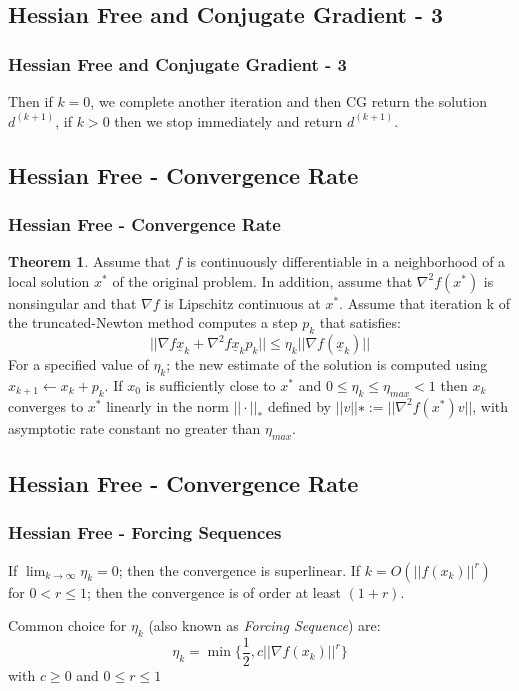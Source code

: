 \documentclass[professionalfont]{beamer}
\begin{document}
  \subsection{Hessian Free and Conjugate Gradient - 3}
	\begin{frame}
	  \frametitle{Hessian Free and Conjugate Gradient - 3}
    \indent Then if $k = 0$, we complete another iteration and then CG return the solution $d^{(k+1)}$,
    if $k > 0$ then we stop immediately and return $d^{(k+1)}$.
    \vspace{4cm}

	\end{frame}

  \subsection{Hessian Free - Convergence Rate}
  \begin{frame}
    \frametitle{Hessian Free - Convergence Rate}
    \textbf{Theorem 1}. Assume that $f$ is continuously differentiable in a neighborhood of a local solution $x^*$ of the original problem.
    In addition, assume that  $\nabla^{2} f(x^*)$ is nonsingular and that $\nabla f$ is Lipschitz continuous at $x^*$.\newline
    Assume that iteration k of the truncated-Newton method computes a step $p_k$ that satisfies:
    \begin{equation}
      || \nabla f{\underline{x}_k} + \nabla^2 f{\underline{x}_k} p_k || \leq \eta_{k} ||\nabla f(\underline{x}_k)||
    \end{equation}
    For a specified value of $\eta_k$; the new estimate of the solution is computed using $x_{k+1} \leftarrow x_k + p_k$. \newline
    If $x_0$ is sufficiently close to $x^*$ and $0 \leq \eta_k \leq \eta_{max} < 1$ then {$x_k$} converges to $x^*$ linearly in the norm $|| \cdot ||_{*}$ defined by
    $||v||∗ := ||\nabla^2 f(x^{*})v||$, with asymptotic rate constant no greater than $\eta_{max}$.\newline
  \end{frame}

  \subsection{Hessian Free - Convergence Rate}
  \begin{frame}
    \frametitle{Hessian Free - Forcing Sequences}
    If $\lim_{k \rightarrow \infty}  \eta_k = 0$; then the convergence is superlinear.\newline
    If  $k = O(||f(x_k)||^r)$ for $0 < r \leq 1$; then the convergence is of order at least $(1 + r)$.\newline\newline

    Common choice for $\eta_k$ (also known as \textit{Forcing Sequence}) are:
    \begin{equation*}
      \eta_{k} = \min{\{\frac{1}{2}, c ||\nabla f(x_k)||^{r}}\}
    \end{equation*}
    with $c \geq 0$ and $0 \leq r \leq 1$

  \end{frame}
\end{document}
